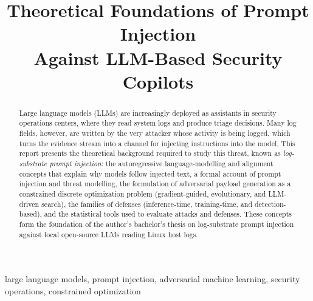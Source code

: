 \documentclass[conference]{IEEEtran}
\begin{document}
\title{Theoretical Foundations of Prompt Injection\\ Against LLM-Based Security Copilots}

\author{
}

\maketitle
\thispagestyle{plain}
\pagestyle{plain}

\begin{abstract}
Large language models (LLMs) are increasingly deployed as assistants in security operations centers, where they read system logs and produce triage decisions. Many log fields, however, are written by the very attacker whose activity is being logged, which turns the evidence stream into a channel for injecting instructions into the model. This report presents the theoretical background required to study this threat, known as \emph{log-substrate prompt injection}: the autoregressive language-modelling and alignment concepts that explain why models follow injected text, a formal account of prompt injection and threat modelling, the formulation of adversarial payload generation as a constrained discrete optimization problem (gradient-guided, evolutionary, and LLM-driven search), the families of defenses (inference-time, training-time, and detection-based), and the statistical tools used to evaluate attacks and defenses. These concepts form the foundation of the author's bachelor's thesis on log-substrate prompt injection against local open-source LLMs reading Linux host logs.
\end{abstract}

\begin{IEEEkeywords}
large language models, prompt injection, adversarial machine learning, security operations, constrained optimization
\end{IEEEkeywords}

\IEEEpeerreviewmaketitle












\end{document}
